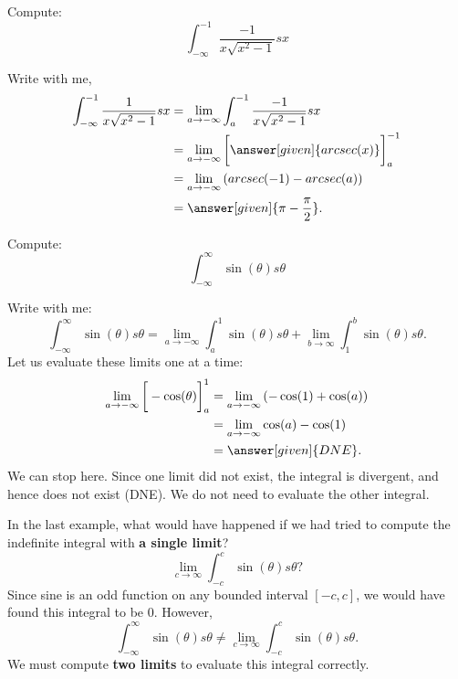 \documentclass{ximera}
\begin{document}
\begin{example}	
  Compute:
  \[
  \int_{-\infty}^{-1}\frac{-1}{x\sqrt{x^2-1}} sx
  \]
  \begin{explanation}
    Write with me,
    \begin{align*}
      \int_{-\infty}^{-1} \frac{1}{x\sqrt{x^2-1}} sx &= \lim_{a \to -\infty} \int_{a}^{-1} \frac{-1}{x\sqrt{x^2-1}}sx\\
      &= \lim_{a \to -\infty} \bigg[\answer[given]{arcsec(x)}\bigg]_{a}^{-1} \\
      &= \lim_{a \to -\infty} \left(arcsec(-1) - arcsec(a)\right)\\
      &= \answer[given]{\pi - \frac{\pi}{2}}.
    \end{align*}
  \end{explanation}
  \end{example}

\begin{example}	
  Compute:
  \[
  \int_{-\infty}^\infty \sin(\theta) s\theta
  \]
  \begin{explanation}
    Write with me:
    \[
    \int_{-\infty}^\infty \sin(\theta) s\theta = \lim_{a\to -\infty} \int_a^1 \sin(\theta) s\theta + \lim_{b\to\infty}\int_1^b \sin(\theta) s\theta.
    \]
    Let us evaluate these limits one at a time:
    \begin{align*}  
      \lim_{a\to -\infty}\bigg[-\cos(\theta)\bigg]_a^1 &= \lim_{a\to -\infty}\left(-\cos(1)+\cos(a)\right)\\
      &= \lim_{a\to -\infty} \cos(a) -\cos(1)\\
      &= \answer[given]{DNE}.
    \end{align*}
    We can stop here. Since one limit did not exist, the integral is
    divergent, and hence does not exist (DNE). We do not need to evaluate the other integral.
  \end{explanation}
\end{example}


\begin{warning}
In the last example, what would have happened if we had tried to
compute the indefinite integral with \textbf{a single limit}?
\[
\lim_{c\to \infty}\int_{-c}^c \sin(\theta)s\theta?
\]
Since sine is an odd function on any bounded interval $[-c,c]$, we
would have found this integral to be $0$. However,
\[
\int_{-\infty}^\infty \sin(\theta) s\theta \ne \lim_{c\to \infty}\int_{-c}^c \sin(\theta)s\theta.
\]
We must compute \textbf{two limits} to evaluate this
integral correctly.

\end{warning}
\end{document}
